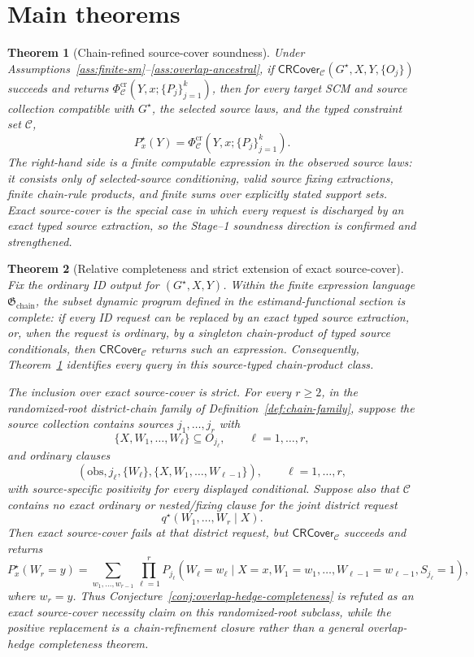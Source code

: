 \documentclass[11pt]{article}
\theoremstyle{definition}
\theoremstyle{plain}
\newtheorem{theorem}{Theorem}
\theoremstyle{remark}
\begin{document}
\section{Main theorems}
\begin{theorem}[Chain-refined source-cover soundness]\label{thm:cr-soundness}
Under Assumptions~\ref{ass:finite-sm}--\ref{ass:overlap-ancestral}, if
\(\mathsf{CRCover}_{\mathcal C}(G^\star,X,Y,\{O_j\})\) succeeds and returns
\(\Phi^{\mathrm{cr}}_{\mathcal C}(Y,x;\{P_j\}_{j=1}^k)\), then for every
target SCM and source collection compatible with \(G^\star\), the selected
source laws, and the typed constraint set \(\mathcal C\),
\[
  P^\star_x(Y)=
  \Phi^{\mathrm{cr}}_{\mathcal C}(Y,x;\{P_j\}_{j=1}^k).
\]
The right-hand side is a finite computable expression in the observed source
laws: it consists only of selected-source conditioning, valid source fixing
extractions, finite chain-rule products, and finite sums over explicitly
stated support sets.  Exact source-cover is the special case in which every
request is discharged by an exact typed source extraction, so the
Stage--1 soundness direction is confirmed and strengthened.
\end{theorem}

\begin{theorem}[Relative completeness and strict extension of exact source-cover]\label{thm:chain-completeness}
Fix the ordinary ID output for \((G^\star,X,Y)\).  Within the finite
expression language \(\mathfrak G_{\mathrm{chain}}\), the subset dynamic
program defined in the estimand-functional section is complete: if every ID
request can be replaced by an exact typed source extraction, or, when the
request is ordinary, by a singleton chain-product of typed source
conditionals, then
\(\mathsf{CRCover}_{\mathcal C}\) returns such an expression.  Consequently,
Theorem~\ref{thm:cr-soundness} identifies every query in this source-typed
chain-product class.

The inclusion over exact source-cover is strict.  For every \(r\ge 2\), in
the randomized-root district-chain family of Definition~\ref{def:chain-family},
suppose the
source
collection contains sources \(j_1,\ldots,j_r\) with
\[
  \{X,W_1,\ldots,W_\ell\}\subseteq O_{j_\ell},
  \qquad \ell=1,\ldots,r,
\]
and ordinary clauses
\[
  (\mathrm{obs},j_\ell,\{W_\ell\},
    \{X,W_1,\ldots,W_{\ell-1}\}),
  \qquad \ell=1,\ldots,r,
\]
with source-specific positivity for every displayed conditional.  Suppose
also that \(\mathcal C\) contains no exact ordinary or nested/fixing clause
for the joint district request
\[
  q^\star(W_1,\ldots,W_r\mid X).
\]
Then exact source-cover fails at that district request, but
\(\mathsf{CRCover}_{\mathcal C}\) succeeds and returns
\[
  P^\star_x(W_r=y)
  =
  \sum_{w_1,\ldots,w_{r-1}}
  \prod_{\ell=1}^{r}
  P_{j_\ell}\!\left(
    W_\ell=w_\ell
    \mid X=x,W_1=w_1,\ldots,W_{\ell-1}=w_{\ell-1},S_{j_\ell}=1
  \right),
\]
where \(w_r=y\).  Thus Conjecture~\ref{conj:overlap-hedge-completeness} is
refuted as an exact source-cover necessity claim on this randomized-root
subclass, while the positive replacement is a chain-refinement closure rather
than a general overlap-hedge completeness theorem.
\end{theorem}
\end{document}

